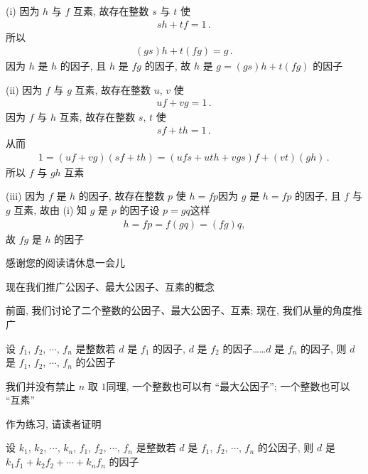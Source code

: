 \begin{pf}
    (i) 因为 $h$ 与 $f$ 互素, 故存在整数 $s$ 与 $t$ 使
    \begin{align*}
        sh + tf = 1 \period
    \end{align*}
    所以
    \begin{align*}
        (gs)h + t(fg) = g \period
    \end{align*}
    因为 $h$ 是 $h$ 的因子, 且 $h$ 是 $fg$ 的因子, 故 $h$ 是 $g = (gs)h + t(fg)$ 的因子\period

    (ii) 因为 $f$ 与 $g$ 互素, 故存在整数 $u$, $v$ 使
    \begin{align*}
        uf + vg = 1 \period
    \end{align*}
    因为 $f$ 与 $h$ 互素, 故存在整数 $s$, $t$ 使
    \begin{align*}
        sf + th = 1 \period
    \end{align*}
    从而
    \begin{align*}
        1 = (uf + vg)(sf + th) = (ufs + uth + vgs)f + (vt)(gh) \period
    \end{align*}
    所以 $f$ 与 $gh$ 互素\period

    (iii) 因为 $f$ 是 $h$ 的因子, 故存在整数 $p$ 使 $h = fp$\period 因为 $g$ 是 $h = fp$ 的因子, 且 $f$ 与 $g$ 互素, 故由 (i) 知 $g$ 是 $p$ 的因子\period 设 $p = gq$\period 这样
    \begin{align*}
        h = fp = f(gq) = (fg)q,
    \end{align*}
    故 $fg$ 是 $h$ 的因子\period
\end{pf}

感谢您的阅读\period 请休息一会儿\period

\myLine

现在我们推广公因子、最大公因子、互素的概念\period

前面, 我们讨论了二个整数的公因子、最大公因子、互素; 现在, 我们从量的角度推广\period

\begin{definition}
    设 $f_1$, $f_2$, $\cdots$, $f_n$ 是整数\period 若 $d$ 是 $f_1$ 的因子, $d$ 是 $f_2$ 的因子……$d$ 是 $f_n$ 的因子, 则 $d$ 是 $f_1$, $f_2$, $\cdots$, $f_n$ 的公因子\period
\end{definition}

\begin{remark}
    我们并没有禁止 $n$ 取 $1$\period 同理, 一个整数也可以有 ``最大公因子''; 一个整数也可以 ``互素''\period
\end{remark}

作为练习, 请读者证明
\begin{proposition}
    设 $k_1$, $k_2$, $\cdots$, $k_n$, $f_1$, $f_2$, $\cdots$, $f_n$ 是整数\period 若 $d$ 是 $f_1$, $f_2$, $\cdots$, $f_n$ 的公因子, 则 $d$ 是 $k_1 f_1 + k_2 f_2 + \cdots + k_n f_n$ 的因子\period
\end{proposition}

